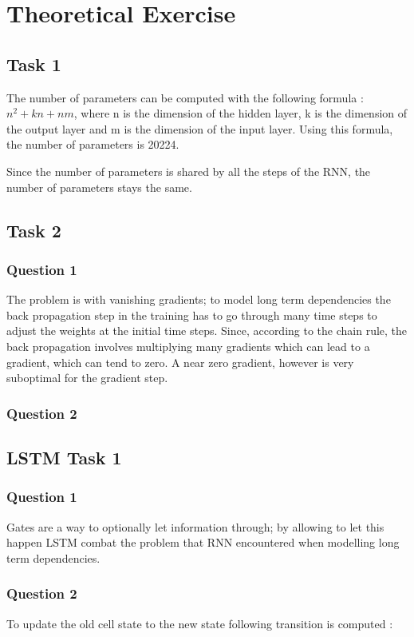 \documentclass[10pt]{article}
\begin{document}
\section{Theoretical Exercise}
\subsection{Task 1}
The number of parameters can be computed with the following formula : 
$n^2+kn+nm$, where n is the dimension of the hidden layer, k is the dimension of the output layer and m is the dimension of the input layer. Using this formula, the number of parameters is 20224. 

Since the number of parameters is shared by all the steps of the RNN, the number of parameters stays the same.

\subsection{Task 2}
\subsubsection{Question 1}
The problem is with vanishing gradients; to model long term dependencies the back propagation step in the training has to go through many time steps to adjust the weights at the initial time steps. Since, according to the chain rule, the back propagation involves multiplying many gradients which can lead to a gradient, which can tend to zero. A near zero gradient, however is very suboptimal for the gradient step. 
\subsubsection{Question 2}


\subsection{LSTM Task 1 }
\subsubsection{Question 1}
Gates are a way to optionally let information through; by allowing to let this happen LSTM combat the problem that RNN encountered when modelling long term dependencies. 
\subsubsection{Question 2}
To update the old cell state to the new state following transition is computed : 
\end{document}
